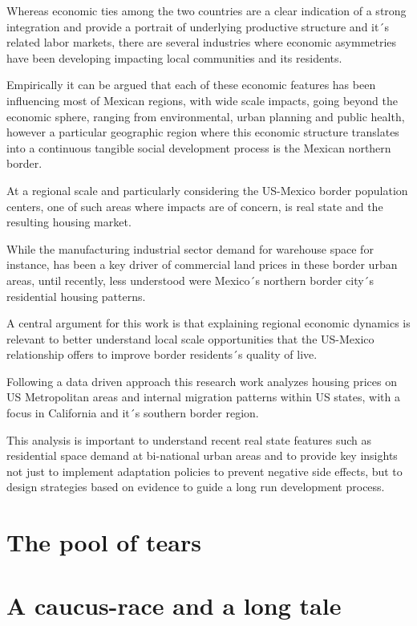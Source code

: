 \documentclass[
]{book}
\begin{document}
Whereas economic ties among the two countries are a clear indication of a strong integration and provide a portrait of underlying productive structure and it´s related labor markets, there are several industries where economic asymmetries have been developing impacting local communities and its residents.

Empirically it can be argued that each of these economic features has been influencing most of Mexican regions, with wide scale impacts, going beyond the economic sphere, ranging from environmental, urban planning and public health, however a particular geographic region where this economic structure translates into a continuous tangible social development process is the Mexican northern border.

At a regional scale and particularly considering the US-Mexico border population centers, one of such areas where impacts are of concern, is real state and the resulting housing market.

While the manufacturing industrial sector demand for warehouse space for instance, has been a key driver of commercial land prices in these border urban areas, until recently, less understood were Mexico´s northern border city´s residential housing patterns.

A central argument for this work is that explaining regional economic dynamics is relevant to better understand local scale opportunities that the US-Mexico relationship offers to improve border residents´s quality of live.

Following a data driven approach this research work analyzes housing prices on US Metropolitan areas and internal migration patterns within US states, with a focus in California and it´s southern border region.

This analysis is important to understand recent real state features such as residential space demand at bi-national urban areas and to provide key insights not just to implement adaptation policies to prevent negative side effects, but to design strategies based on evidence to guide a long run development process.

\hypertarget{the-pool-of-tears}{%
\chapter{The pool of tears}\label{the-pool-of-tears}}

\hypertarget{a-caucus-race-and-a-long-tale}{%
\chapter{A caucus-race and a long tale}\label{a-caucus-race-and-a-long-tale}}

  
\end{document}

